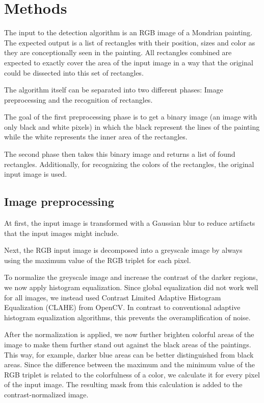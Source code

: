 
\section{Methods}

The input to the detection algorithm is an RGB image of a Mondrian painting. The
expected output is a list of rectangles with their position, sizes and color as
they are conceptionally seen in the painting. All rectangles combined are
expected to exactly cover the area of the input image in a way that the original
could be dissected into this set of rectangles.

The algorithm itself can be separated into two different phases: Image
preprocessing and the recognition of rectangles.

The goal of the first preprocessing phase is to get a binary image (an image
with only black and white pixels) in which the black represent the lines of the
painting while the white represents the inner area of the rectangles.

The second phase then takes this binary image and returns a list of found
rectangles. Additionally, for recognizing the colors of the rectangles, the
original input image is used.

\subsection{Image preprocessing}

At first, the input image is transformed with a Gaussian blur to reduce
artifacts that the input images might include.

Next, the RGB input image is decomposed into a greyscale image by always using
the maximum value of the RGB triplet for each pixel.

To normalize the greyscale image and increase the contrast of the darker
regions, we now apply histogram equalization. Since global equalization did not
work well for all images, we instead used Contrast Limited Adaptive Histogram
Equalization (CLAHE) from OpenCV. In contrast to conventional adaptive histogram
equalization algorithms, this prevents the overamplification of noise.

After the normalization is applied, we now further brighten colorful areas of
the image to make them further stand out against the black areas of the
paintings. This way, for example, darker blue areas can be better distinguished
from black areas. Since the difference between the maximum and the minimum value
of the RGB triplet is related to the colorfulness of a color, we calculate it
for every pixel of the input image. The resulting mask from this calculation is
added to the contrast-normalized image.

